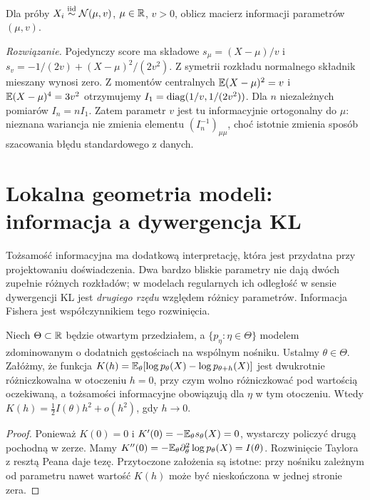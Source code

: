 \begin{zadanie}
Dla próby $X_i\mathrel{\overset{\mathrm{iid}}\sim}\mathcal N(\mu,v)$, $\mu\in\mathbb R$, $v>0$,
oblicz macierz informacji parametrów $(\mu,v)$.
\par\emph{Rozwiązanie.} Pojedynczy score ma składowe
$s_\mu=(X-\mu)/v$ i
$s_v=-1/(2v)+(X-\mu)^2/(2v^2)$.
Z symetrii rozkładu normalnego składnik mieszany wynosi zero.
Z momentów centralnych $\mathbb E(X-\mu)^2=v$ i
$\mathbb E(X-\mu)^4=3v^2$ otrzymujemy
$I_1=\operatorname{diag}(1/v,1/(2v^2))$.
Dla $n$ niezależnych pomiarów $I_n=nI_1$.
Zatem parametr $v$ jest tu informacyjnie ortogonalny do $\mu$:
nieznana wariancja nie zmienia elementu $(I_n^{-1})_{\mu\mu}$,
choć istotnie zmienia sposób szacowania błędu standardowego z danych.
\end{zadanie}


\section{Lokalna geometria modeli: informacja a dywergencja KL}
Tożsamość informacyjna ma dodatkową interpretację, która jest
przydatna przy projektowaniu doświadczenia. Dwa bardzo bliskie
parametry nie dają dwóch zupełnie różnych rozkładów; w modelach
regularnych ich odległość w sensie dywergencji KL jest
\emph{drugiego rzędu} względem różnicy parametrów. Informacja
Fishera jest współczynnikiem tego rozwinięcia.

\begin{stwierdzenie}
\label{prop:kl-fisher-expansion}
Niech $\Theta\subset\mathbb R$ będzie otwartym przedziałem, a
$\{p_\eta:\eta\in\Theta\}$ modelem zdominowanym o dodatnich
gęstościach na wspólnym nośniku. Ustalmy $\theta\in\Theta$.
Załóżmy, że funkcja
$K(h)=\mathbb E_\theta[\log p_\theta(X)-\log p_{\theta+h}(X)]$
jest dwukrotnie różniczkowalna w otoczeniu $h=0$, przy czym
wolno różniczkować pod wartością oczekiwaną, a tożsamości
informacyjne obowiązują dla $\eta$ w tym otoczeniu.
Wtedy
$K(h)=\tfrac12 I(\theta)h^2+o(h^2)$, gdy $h\to0$.
\end{stwierdzenie}
\begin{proof}
Ponieważ $K(0)=0$ i $K'(0)=-\mathbb E_\theta s_\theta(X)=0$,
wystarczy policzyć drugą pochodną w zerze.
Mamy $K''(0)=-\mathbb E_\theta\partial_\theta^2\log p_\theta(X)
=I(\theta)$. Rozwinięcie Taylora z resztą Peana daje tezę.
Przytoczone założenia są istotne: przy nośniku zależnym od
parametru nawet wartość $K(h)$ może być nieskończona w jednej
stronie zera.
\end{proof}

